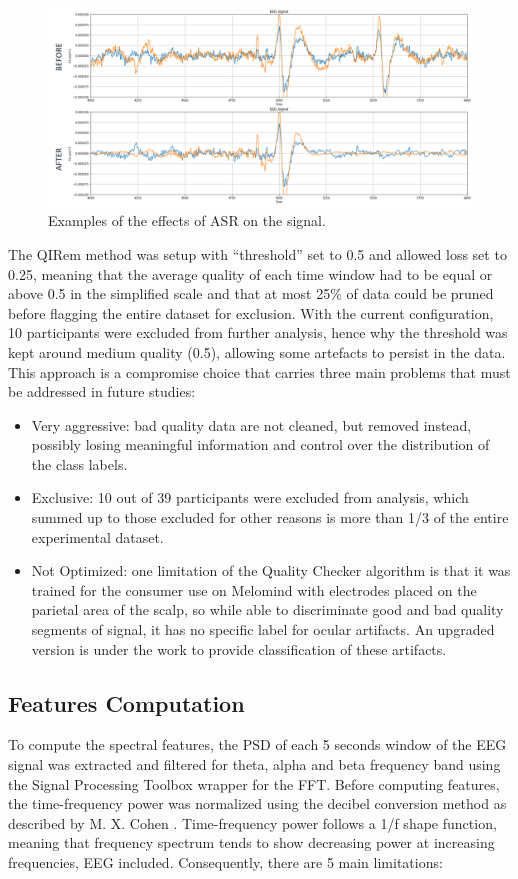 \begin{figure}[h!]
\includegraphics[width=15cm]{img/methods/asr_example.png}
\centering
\caption{Examples of the effects of ASR on the signal.} \label{fig_asr_example}
\end{figure}

The \ac{QIRem} method was setup with “threshold” set to 0.5 and allowed loss set to 0.25, meaning that the average quality of each time window had to be equal or above 0.5 in the simplified scale and that at most 25\% of data could be pruned before flagging the entire dataset for exclusion. With the current configuration, 10 participants were excluded from further analysis, hence why the threshold was kept around medium quality (0.5), allowing some artefacts to persist in the data. This approach is a compromise choice that carries three main problems that must be addressed in future studies:
\begin{itemize}
\item 	Very aggressive: bad quality data are not cleaned, but removed instead, possibly losing meaningful information and control over the distribution of the class labels.
\item 	Exclusive: 10 out of 39 participants were excluded from analysis, which summed up to those excluded for other reasons is more than 1/3 of the entire experimental dataset.
\item 	Not Optimized: one limitation of the Quality Checker algorithm is that it was trained for the consumer use on Melomind with electrodes placed on the parietal area of the scalp, so while able to discriminate good and bad quality segments of signal, it has no specific label for ocular artifacts. An upgraded version is under the work to provide classification of these artifacts.
\end{itemize}

\subsection{Features Computation}
\label{sec:features_computation}
To compute the spectral features, the \ac{PSD} of each 5 seconds window of the \ac{EEG} signal was extracted and filtered for theta, alpha and beta frequency band using the Signal Processing Toolbox wrapper for the \ac{FFT}. Before computing features, the time-frequency power was normalized using the decibel conversion method as described by M. X. Cohen \cite{cohen_analyzing_2014}. Time-frequency power follows a 1/f shape function, meaning that frequency spectrum tends to show decreasing power at increasing frequencies, \ac{EEG} included. Consequently, there are 5 main limitations:

